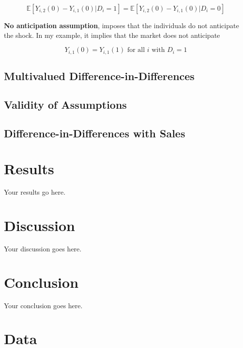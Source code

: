 \documentclass[12pt]{article}
\begin{document}
\begin{equation}
    \mathbb{E}[Y_{i,2}(0) - Y_{i,1}(0) | D_i = 1] = \mathbb{E}[Y_{i,2}(0) - Y_{i,1}(0) | D_i = 0]
\end{equation}

\textbf{No anticipation assumption}, imposes that the individuals do not anticipate the shock. In my example, it implies that the market does not anticipate 

\begin{equation}
    Y_{i,1}(0) = Y_{i,1}(1) \text{ for all } i \text{ with } D_i = 1
\end{equation}



\subsection{Multivalued Difference-in-Differences}

\subsection{Validity of Assumptions}

\subsection{Difference-in-Differences with Sales}


\newpage

\section{Results}\label{sect:results}
Your results go here.

\section{Discussion}\label{sect:discussion}
Your discussion goes here.

\section{Conclusion}\label{sect:conclusion}
Your conclusion goes here.

\pagebreak
\printbibliography{}
\pagebreak
\appendix

\section{Data}\label{app:data}
\end{document}
